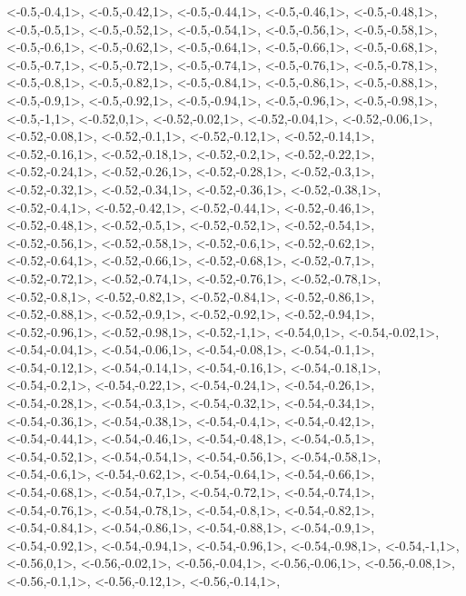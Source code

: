 \documentclass[a4paper,10pt]{article}
\begin{document}
\begin{eulernotebook}
\begin{euleroutput}
  <-0.5,-0.4,1>,
  <-0.5,-0.42,1>,
  <-0.5,-0.44,1>,
  <-0.5,-0.46,1>,
  <-0.5,-0.48,1>,
  <-0.5,-0.5,1>,
  <-0.5,-0.52,1>,
  <-0.5,-0.54,1>,
  <-0.5,-0.56,1>,
  <-0.5,-0.58,1>,
  <-0.5,-0.6,1>,
  <-0.5,-0.62,1>,
  <-0.5,-0.64,1>,
  <-0.5,-0.66,1>,
  <-0.5,-0.68,1>,
  <-0.5,-0.7,1>,
  <-0.5,-0.72,1>,
  <-0.5,-0.74,1>,
  <-0.5,-0.76,1>,
  <-0.5,-0.78,1>,
  <-0.5,-0.8,1>,
  <-0.5,-0.82,1>,
  <-0.5,-0.84,1>,
  <-0.5,-0.86,1>,
  <-0.5,-0.88,1>,
  <-0.5,-0.9,1>,
  <-0.5,-0.92,1>,
  <-0.5,-0.94,1>,
  <-0.5,-0.96,1>,
  <-0.5,-0.98,1>,
  <-0.5,-1,1>,
  <-0.52,0,1>,
  <-0.52,-0.02,1>,
  <-0.52,-0.04,1>,
  <-0.52,-0.06,1>,
  <-0.52,-0.08,1>,
  <-0.52,-0.1,1>,
  <-0.52,-0.12,1>,
  <-0.52,-0.14,1>,
  <-0.52,-0.16,1>,
  <-0.52,-0.18,1>,
  <-0.52,-0.2,1>,
  <-0.52,-0.22,1>,
  <-0.52,-0.24,1>,
  <-0.52,-0.26,1>,
  <-0.52,-0.28,1>,
  <-0.52,-0.3,1>,
  <-0.52,-0.32,1>,
  <-0.52,-0.34,1>,
  <-0.52,-0.36,1>,
  <-0.52,-0.38,1>,
  <-0.52,-0.4,1>,
  <-0.52,-0.42,1>,
  <-0.52,-0.44,1>,
  <-0.52,-0.46,1>,
  <-0.52,-0.48,1>,
  <-0.52,-0.5,1>,
  <-0.52,-0.52,1>,
  <-0.52,-0.54,1>,
  <-0.52,-0.56,1>,
  <-0.52,-0.58,1>,
  <-0.52,-0.6,1>,
  <-0.52,-0.62,1>,
  <-0.52,-0.64,1>,
  <-0.52,-0.66,1>,
  <-0.52,-0.68,1>,
  <-0.52,-0.7,1>,
  <-0.52,-0.72,1>,
  <-0.52,-0.74,1>,
  <-0.52,-0.76,1>,
  <-0.52,-0.78,1>,
  <-0.52,-0.8,1>,
  <-0.52,-0.82,1>,
  <-0.52,-0.84,1>,
  <-0.52,-0.86,1>,
  <-0.52,-0.88,1>,
  <-0.52,-0.9,1>,
  <-0.52,-0.92,1>,
  <-0.52,-0.94,1>,
  <-0.52,-0.96,1>,
  <-0.52,-0.98,1>,
  <-0.52,-1,1>,
  <-0.54,0,1>,
  <-0.54,-0.02,1>,
  <-0.54,-0.04,1>,
  <-0.54,-0.06,1>,
  <-0.54,-0.08,1>,
  <-0.54,-0.1,1>,
  <-0.54,-0.12,1>,
  <-0.54,-0.14,1>,
  <-0.54,-0.16,1>,
  <-0.54,-0.18,1>,
  <-0.54,-0.2,1>,
  <-0.54,-0.22,1>,
  <-0.54,-0.24,1>,
  <-0.54,-0.26,1>,
  <-0.54,-0.28,1>,
  <-0.54,-0.3,1>,
  <-0.54,-0.32,1>,
  <-0.54,-0.34,1>,
  <-0.54,-0.36,1>,
  <-0.54,-0.38,1>,
  <-0.54,-0.4,1>,
  <-0.54,-0.42,1>,
  <-0.54,-0.44,1>,
  <-0.54,-0.46,1>,
  <-0.54,-0.48,1>,
  <-0.54,-0.5,1>,
  <-0.54,-0.52,1>,
  <-0.54,-0.54,1>,
  <-0.54,-0.56,1>,
  <-0.54,-0.58,1>,
  <-0.54,-0.6,1>,
  <-0.54,-0.62,1>,
  <-0.54,-0.64,1>,
  <-0.54,-0.66,1>,
  <-0.54,-0.68,1>,
  <-0.54,-0.7,1>,
  <-0.54,-0.72,1>,
  <-0.54,-0.74,1>,
  <-0.54,-0.76,1>,
  <-0.54,-0.78,1>,
  <-0.54,-0.8,1>,
  <-0.54,-0.82,1>,
  <-0.54,-0.84,1>,
  <-0.54,-0.86,1>,
  <-0.54,-0.88,1>,
  <-0.54,-0.9,1>,
  <-0.54,-0.92,1>,
  <-0.54,-0.94,1>,
  <-0.54,-0.96,1>,
  <-0.54,-0.98,1>,
  <-0.54,-1,1>,
  <-0.56,0,1>,
  <-0.56,-0.02,1>,
  <-0.56,-0.04,1>,
  <-0.56,-0.06,1>,
  <-0.56,-0.08,1>,
  <-0.56,-0.1,1>,
  <-0.56,-0.12,1>,
  <-0.56,-0.14,1>,

\end{euleroutput}
\end{eulernotebook}
\end{document}
